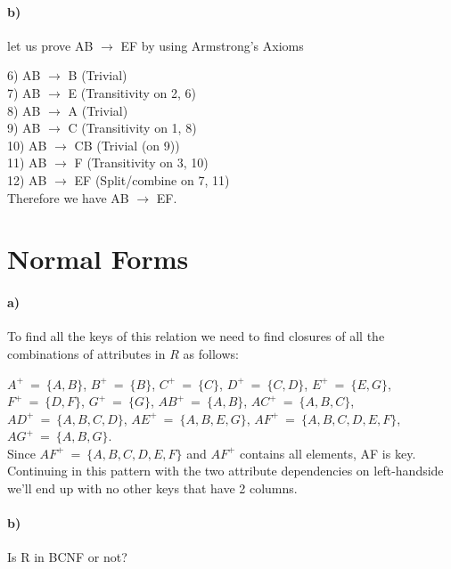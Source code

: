 \documentclass[a4paper,12pt]{article}
\begin{document}
\paragraph{b)} let us prove AB $\rightarrow$ EF by using Armstrong's Axioms \\

\begin{tcolorbox}
6) AB $\rightarrow$ B (Trivial) \\
7) AB $\rightarrow$ E (Transitivity on 2, 6) \\
8) AB $\rightarrow$ A (Trivial) \\
9) AB $\rightarrow$ C (Transitivity on 1, 8) \\
10) AB $\rightarrow$ CB (Trivial (on 9)) \\
11) AB $\rightarrow$ F (Transitivity on 3, 10) \\
12) AB $\rightarrow$ EF (Split/combine on 7, 11) \\
Therefore we have AB $\rightarrow$ EF.
\end{tcolorbox}

\section{Normal Forms}

\paragraph{a)} To find all the keys of this relation we need to find closures of all the combinations of attributes in $R$ as follows:\\

\begin{tcolorbox}
$A^+\ = \ \{A,B\}$, $B^+\ = \ \{B\}$, $C^+\ = \ \{C\}$, $D^+\ = \ \{C,D\}$, $E^+\ = \ \{E,G\}$, $F^+\ = \ \{D,F\}$, $G^+\ = \ \{G\}$, $AB^+\ = \ \{A,B\}$, $AC^+\ = \ \{A,B,C\}$, $AD^+\ = \ \{A,B,C,D\}$, $AE^+\ = \ \{A,B,E,G\}$, $AF^+\ = \ \{A,B,C,D,E,F\}$, $AG^+\ = \ \{A,B,G\}$. \\
Since $AF^+\ = \ \{A,B,C,D,E,F\}$ and $AF^+$ contains all elements, AF is key.\\
Continuing in this pattern with the two attribute dependencies on left-handside we'll end up with no other keys that have 2 columns.
\end{tcolorbox}

\paragraph{b)} Is R in BCNF or not? \\
\end{document}
